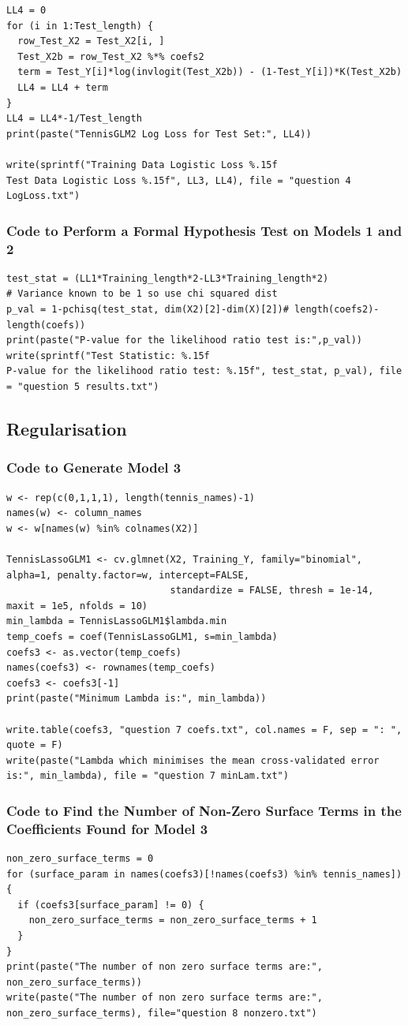 \documentclass[11pt]{article} %
\begin{document}
\begin{lstlisting}
LL4 = 0
for (i in 1:Test_length) {
  row_Test_X2 = Test_X2[i, ]
  Test_X2b = row_Test_X2 %*% coefs2
  term = Test_Y[i]*log(invlogit(Test_X2b)) - (1-Test_Y[i])*K(Test_X2b)
  LL4 = LL4 + term
}
LL4 = LL4*-1/Test_length
print(paste("TennisGLM2 Log Loss for Test Set:", LL4))

write(sprintf("Training Data Logistic Loss %.15f
Test Data Logistic Loss %.15f", LL3, LL4), file = "question 4 LogLoss.txt")
\end{lstlisting}
\subsubsection*{Code to Perform a Formal Hypothesis Test on Models 1 and 2}
\begin{lstlisting}
test_stat = (LL1*Training_length*2-LL3*Training_length*2)
# Variance known to be 1 so use chi squared dist
p_val = 1-pchisq(test_stat, dim(X2)[2]-dim(X)[2])# length(coefs2)-length(coefs))
print(paste("P-value for the likelihood ratio test is:",p_val))
write(sprintf("Test Statistic: %.15f
P-value for the likelihood ratio test: %.15f", test_stat, p_val), file = "question 5 results.txt")
\end{lstlisting}
\subsection*{Regularisation}
\subsubsection*{Code to Generate Model 3}
\begin{lstlisting}
w <- rep(c(0,1,1,1), length(tennis_names)-1)
names(w) <- column_names
w <- w[names(w) %in% colnames(X2)]

TennisLassoGLM1 <- cv.glmnet(X2, Training_Y, family="binomial", alpha=1, penalty.factor=w, intercept=FALSE,
                             standardize = FALSE, thresh = 1e-14, maxit = 1e5, nfolds = 10)
min_lambda = TennisLassoGLM1$lambda.min
temp_coefs = coef(TennisLassoGLM1, s=min_lambda)
coefs3 <- as.vector(temp_coefs)
names(coefs3) <- rownames(temp_coefs)
coefs3 <- coefs3[-1]
print(paste("Minimum Lambda is:", min_lambda))

write.table(coefs3, "question 7 coefs.txt", col.names = F, sep = ": ", quote = F)
write(paste("Lambda which minimises the mean cross-validated error is:", min_lambda), file = "question 7 minLam.txt")
\end{lstlisting}
\subsubsection*{Code to Find the Number of Non-Zero Surface Terms in the Coefficients Found for Model 3}
\begin{lstlisting}
non_zero_surface_terms = 0
for (surface_param in names(coefs3)[!names(coefs3) %in% tennis_names]) {
  if (coefs3[surface_param] != 0) {
    non_zero_surface_terms = non_zero_surface_terms + 1
  }
}
print(paste("The number of non zero surface terms are:", non_zero_surface_terms))
write(paste("The number of non zero surface terms are:", non_zero_surface_terms), file="question 8 nonzero.txt")
\end{lstlisting}
\end{document}

